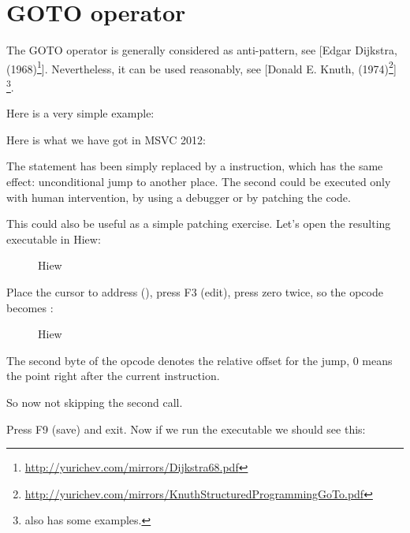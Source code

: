 \section{GOTO operator}

The GOTO operator is generally considered as anti-pattern, see
[Edgar Dijkstra,  (1968)\footnote{\url{http://yurichev.com/mirrors/Dijkstra68.pdf}}].
Nevertheless, it can be used reasonably, see 
[Donald E. Knuth,  (1974)\footnote{\url{http://yurichev.com/mirrors/KnuthStructuredProgrammingGoTo.pdf}}]
\footnote{\InSqBrackets{\CNotes} also has some examples.}.

Here is a very simple example:



Here is what we have got in MSVC 2012:



The  statement has been simply replaced by a \JMP instruction, which has the same effect: unconditional jump to another place.
The second \printf could be executed only with human intervention, by using a debugger or by patching the code.

\par

\clearpage

This could also be useful as a simple patching exercise. Let's open the resulting executable in Hiew:

\begin{figure}[H]
\centering
{}
\caption{Hiew}
\label{fig:goto_hiew1}
\end{figure}

\clearpage
Place the cursor to address \JMP (), 
press F3 (edit), press zero twice, so the opcode becomes :

\begin{figure}[H]
\centering
{}
\caption{Hiew}
\label{fig:goto_hiew2}
\end{figure}

The second byte of the \JMP opcode denotes the relative offset for the jump, 0 means the point
right after the current instruction.

So now \JMP not skipping the second \printf call.

Press F9 (save) and exit.  Now if we run the executable we should see this:

